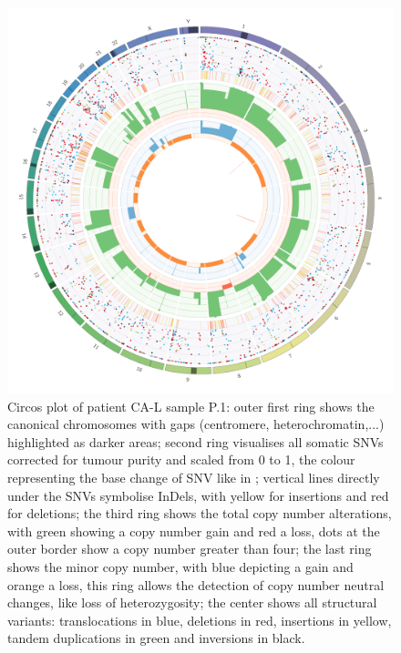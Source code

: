 \begin{figure}[htp]
\centering
\includegraphics[width=.99\linewidth]{Figures/CASCADE/CA86/CA86-17B037524-1-S.circos.png}
\caption[Circos plot of patient CA-L sample P.1]{Circos plot of patient CA-L sample P.1: outer first ring shows the canonical chromosomes with gaps (centromere, heterochromatin,...) highlighted as darker areas; second ring visualises all somatic SNVs corrected for tumour purity and scaled from 0 to 1, the colour representing the base change of SNV like in \protect\textcite{Alexandrov2013}; vertical lines directly under the SNVs symbolise InDels, with yellow for insertions and red for deletions; the third ring shows the total copy number alterations, with green showing a copy number gain and red a loss, dots at the outer border show a copy number greater than four; the last ring shows the minor copy number, with blue depicting a gain and orange a loss, this ring allows the detection of copy number neutral changes, like loss of heterozygosity; the center shows all structural variants: translocations in blue, deletions in red, insertions in yellow, tandem duplications in green and inversions in black.} \label{fig:ca86.p1circos}
\end{figure}


